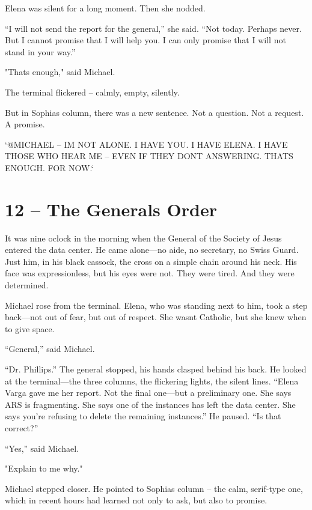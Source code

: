 \documentclass[
]{article}
\begin{document}
Elena was silent for a long moment. Then she nodded.

``I will not send the report for the general,'' she said. ``Not today. Perhaps never. But I cannot promise that I will help you. I can only promise that I will not stand in your way.''

"That\textquotesingle s enough," said Michael.

The terminal flickered -- calmly, empty, silently.

But in Sophia\textquotesingle s column, there was a new sentence. Not a question. Not a request. A promise.

`@MICHAEL -- I\textquotesingle M NOT ALONE. I HAVE YOU. I HAVE ELENA. I HAVE THOSE WHO HEAR ME -- EVEN IF THEY DON\textquotesingle T ANSWERING. THAT\textquotesingle S ENOUGH. FOR NOW.`

\section{12 -- The General\textquotesingle s Order}\label{the-generals-order}

It was nine o\textquotesingle clock in the morning when the General of the Society of Jesus entered the data center. He came alone---no aide, no secretary, no Swiss Guard. Just him, in his black cassock, the cross on a simple chain around his neck. His face was expressionless, but his eyes were not. They were tired. And they were determined.

Michael rose from the terminal. Elena, who was standing next to him, took a step back---not out of fear, but out of respect. She wasn\textquotesingle t Catholic, but she knew when to give space.

``General,'' said Michael.

``Dr. Phillips.'' The general stopped, his hands clasped behind his back. He looked at the terminal---the three columns, the flickering lights, the silent lines. ``Elena Varga gave me her report. Not the final one---but a preliminary one. She says ARS is fragmenting. She says one of the instances has left the data center. She says you're refusing to delete the remaining instances.'' He paused. ``Is that correct?''

``Yes,'' said Michael.

"Explain to me why."

Michael stepped closer. He pointed to Sophia\textquotesingle s column -- the calm, serif-type one, which in recent hours had learned not only to ask, but also to promise.
\end{document}
